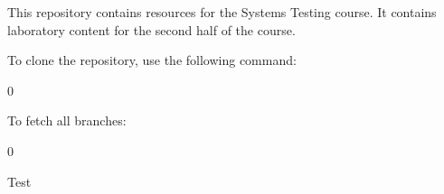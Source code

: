 This repository contains resources for the Systems Testing course. It contains laboratory content for the second half of the course.

To clone the repository, use the following command\+: 
\begin{DoxyCode}{0}
\end{DoxyCode}


To fetch all branches\+: 
\begin{DoxyCode}{0}
\end{DoxyCode}


Test 